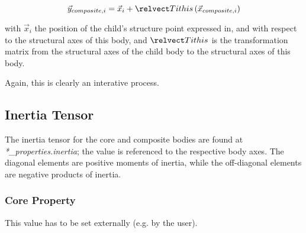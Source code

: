 \begin{equation}
 \vec{y}_{composite,i} = \vec{x}_i + \relvect T i {this} \left(
 \vec{x}_{composite,i} \right)
\end{equation}

with $\vec{x}_i$ the position of the child's structure point expressed in, and
with respect to the structural axes of this body, and $\relvect T i {this}$ is
the transformation matrix from the structural axes of the child body to the
structural axes of this body.

Again, this is clearly an interative process.


\subsection{Inertia Tensor}
The inertia tensor for the core and composite bodies are found at
\textit{*\_properties.inertia}; the value is referenced to the respective body
axes. The diagonal elements are positive moments of inertia, while the
off-diagonal elements are negative products of inertia.


\subsubsection {Core Property}
This value has to be set externally (e.g. by the user).
